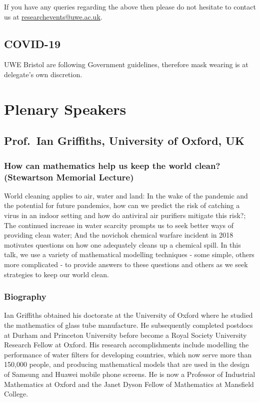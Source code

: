 \documentclass[12pt,a4paper]{article}
\begin{document}
If you have any queries regarding the above then please do not hesitate to contact us at \href{mailto:researchevents@uwe.ac.uk}{researchevents@uwe.ac.uk}.

\subsection{COVID-19}

UWE Bristol are following Government guidelines, therefore mask wearing is at delegate's own discretion.

\section{Plenary Speakers}

\subsection{Prof.~Ian Griffiths, University of Oxford, UK}

\subsubsection{How can mathematics help us keep the world clean? (Stewartson Memorial Lecture)}

World cleaning applies to air, water and land: In the wake of the pandemic and the potential for future pandemics, how can we predict the risk of catching a virus in an indoor setting and how do antiviral air purifiers mitigate this risk?; The continued increase in water scarcity prompts us to seek better ways of providing clean water; And the novichok chemical warfare incident in 2018 motivates questions on how one adequately cleans up a chemical spill. In this talk, we use a variety of mathematical modelling techniques - some simple, others more complicated - to provide answers to these questions and others as we seek strategies to keep our world clean.

\subsubsection{Biography}

Ian Griffiths obtained his doctorate at the University of Oxford where he studied the mathematics of glass tube manufacture. He subsequently completed postdocs at Durham and Princeton University before become a Royal Society University Research Fellow at Oxford. His research accomplishments include modelling the performance of water filters for developing countries, which now serve more than 150,000 people, and producing mathematical models that are used in the design of Samsung and Huawei mobile phone screens. He is now a Professor of Industrial Mathematics at Oxford and the Janet Dyson Fellow of Mathematics at Mansfield College.
\end{document}
